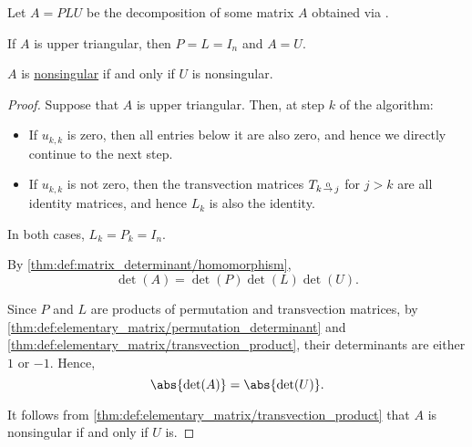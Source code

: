 \begin{proposition}\label{thm:alg:plu_decomposition}
  Let \( A = PLU \) be the decomposition of some matrix \( A \) obtained via .

  \begin{thmenum}
     If \( A \) is upper triangular, then \( P = L = I_n \) and \( A = U \).

     \( A \) is \hyperref[def:inverse_matrix]{nonsingular} if and only if \( U \) is nonsingular.
  \end{thmenum}
\end{proposition}
\begin{proof}
   Suppose that \( A \) is upper triangular. Then, at step \( k \) of the algorithm:
  \begin{itemize}
     \item If \( u_{k,k} \) is zero, then all entries below it are also zero, and hence we directly continue to the next step.
     \item If \( u_{k,k} \) is not zero, then the transvection matrices \( T_{k \reloset 0 \to j} \) for \( j > k \) are all identity matrices, and hence \( L_k \) is also the identity.
  \end{itemize}

  In both cases, \( L_k = P_k = I_n \).

   By \cref{thm:def:matrix_determinant/homomorphism},
  \begin{equation*}
    \det(A) = \det(P) \det(L) \det(U).
  \end{equation*}

  Since \( P \) and \( L \) are products of permutation and transvection matrices, by \cref{thm:def:elementary_matrix/permutation_determinant} and \cref{thm:def:elementary_matrix/transvection_product}, their determinants are either \( 1 \) or \( -1 \). Hence,
  \begin{equation*}
    \abs{\det(A)} = \abs{\det(U)}.
  \end{equation*}

  It follows from \cref{thm:def:elementary_matrix/transvection_product} that \( A \) is nonsingular if and only if \( U \) is.
\end{proof}

